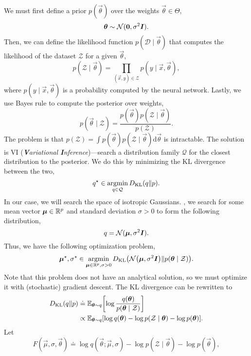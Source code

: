 
We must first define a prior $p(\vec{\theta})$ over the weights $\vec{\theta} \in \Theta$, \[
    \bm{\theta} \sim \mathcal{N}(\bm{0}, \sigma^2 \bm{I}).
\]
Then, we can define the likelihood function $p(\mathcal{D} \mid \vec{\theta})$ that computes the
likelihood of the dataset $\mathcal{Z}$ for a given $\vec{\theta}$, \[
    p(\mathcal{Z} \mid \vec{\theta}) = \prod_{(\vec{x}, y) \in \mathcal{Z}} p(y \mid \vec{x}, \vec{\theta}),
\]
where $p(y\mid \vec{x}, \vec{\theta})$ is a probability computed by the neural network. Lastly, we
use Bayes rule to compute the posterior over weights, \[
    p(\vec{\theta} \mid \mathcal{Z}) = \frac{p(\vec{\theta}) p(\mathcal{Z} \mid \vec{\theta})}{p(\mathcal{Z})}.
\]
The problem is that $p(\mathcal{Z}) = \int p(\vec{\theta}) p(\mathcal{Z} \mid \vec{\theta})
    \mathrm{d}\vec{\theta}$ is intractable. The solution is VI (\textit{\textbf{V}ariational
    \textbf{I}nference})---search a distribution family $\mathcal{Q}$ for the closest distribution to
the posterior. We do this by
minimizing the KL divergence between the two, \[
    q^\star \in \operatorname*{argmin}_{q \in \mathcal{Q}} D_{\mathrm{KL}}(q \| p).
\]
In our case, we will search the space of isotropic Gaussians. \Ie, we search for some mean vector
$\bm{\mu} \in \mathbb{R}^p$ and standard deviation $\sigma > 0$ to form the following distribution, \[
    q = \mathcal{N}(\bm{\mu}, \sigma^2 \bm{I}).
\]
Thus, we have the following optimization problem, \[
    \vec{\mu}^\star, \sigma^\star \in \argmin_{\vec{\mu} \in \R^p, \sigma > 0} D_{\mathrm{KL}}\lft(\mathcal{N}\lft(\vec{\mu}, \sigma^2 \mat{I}\rgt) \| p(\vec{\theta} \mid \mathcal{Z})\rgt).
\]
Note that this problem does not have an analytical solution, so we must optimize it with
(stochastic) gradient descent. The KL divergence can be rewritten to
\begin{align*}
    D_{\mathrm{KL}}(q \| p) & \doteq \E_{\vec{\theta} \sim q} \lft[ \log \frac{q(\vec{\theta})}{p(\vec{\theta} \mid \mathcal{Z})} \rgt]                         \\
                            & \propto \E_{\vec{\theta} \sim q} \lft[ \log q(\vec{\theta}) - \log p(\mathcal{Z} \mid \vec{\theta}) - \log p(\vec{\theta}) \rgt].
\end{align*}
Let \[
    F(\vec{\mu}, \sigma, \vec{\theta}) \doteq \log q(\vec{\theta}; \vec{\mu}, \sigma) - \log p(\mathcal{Z} \mid \vec{\theta}) - \log p(\vec{\theta}),
\]
